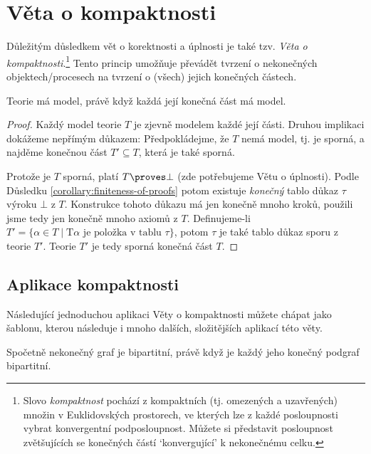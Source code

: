 


\section{Věta o kompaktnosti}

Důležitým důsledkem vět o korektnosti a úplnosti je také tzv. \emph{Věta o kompaktnosti}.\footnote{Slovo \emph{kompaktnost} pochází z kompaktních (tj. omezených a uzavřených) množin v Euklidovských prostorech, ve kterých lze z každé posloupnosti vybrat konvergentní podposloupnost. Můžete si představit posloupnost zvětšujících se konečných částí `konvergující' k nekonečnému celku.} Tento princip umožňuje převádět tvrzení o nekonečných objektech/procesech na tvrzení o (všech) jejich konečných částech.

\begin{theorem}[O kompaktnosti]\label{theorem:compactness-theorem}
Teorie má model, právě když každá její konečná část má model.    
\end{theorem}

\begin{proof}
Každý model teorie $T$ je zjevně modelem každé její části. Druhou implikaci dokážeme nepřímým důkazem: Předpokládejme, že $T$ nemá model, tj. je sporná, a najděme konečnou část $T'\subseteq T$, která je také sporná.

Protože je $T$ sporná, platí $T\proves\bot$ (zde potřebujeme Větu o úplnosti). Podle Důsledku \ref{corollary:finiteness-of-proofs} potom existuje \emph{konečný} tablo důkaz $\tau$ výroku $\bot$ z $T$. Konstrukce tohoto důkazu má jen konečně mnoho kroků, použili jsme tedy jen konečně mnoho axiomů z $T$. Definujeme-li $T'=\{\alpha\in T\mid \mathrm{T}\alpha\text{ je položka v tablu $\tau$}\}$, potom $\tau$ je také tablo důkaz sporu z teorie $T'$. Teorie $T'$ je tedy sporná konečná část $T$.
\end{proof}

\subsection{Aplikace kompaktnosti}

Následující jednoduchou aplikaci Věty o kompaktnosti můžete chápat jako šablonu, kterou následuje i mnoho dalších, složitějších aplikací této věty. 

\begin{corollary}\label{corollary:infinite-bipartite-compactness}
Spočetně nekonečný graf je bipartitní, právě když je každý jeho konečný podgraf bipartitní.    
\end{corollary}

